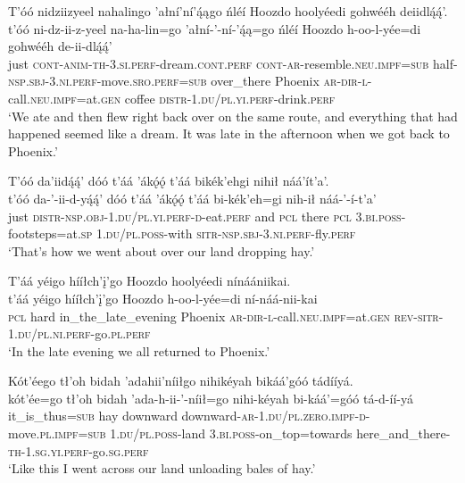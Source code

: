 \ea\label{ex:text9-3-28}
T’óó nidziizyeel nahalingo ’ałní’ní’ą́ągo ńléí Hoozdo hoolyéedi gohwééh deiidlą́ą́’.\\
\gll t’óó	ni-dz-ii-z-yeel	na-ha-lin=go	’ałní-’-ní-’ą́ą=go	ńléí	Hoozdo	h-oo-l-yée=di	gohwééh	de-ii-dlą́ą́’\\
     just	\textsc{cont}-\textsc{anim}-\textsc{th}-3.\textsc{si}.\textsc{perf}-dream.\textsc{cont}.\textsc{perf}	\textsc{cont}-\textsc{ar}-resemble.\textsc{neu}.\textsc{impf}=\textsc{sub}	half-\textsc{nsp}.\textsc{sbj}-3.\textsc{ni}.\textsc{perf}-move.\textsc{sro}.\textsc{perf}=\textsc{sub}	over\_there	Phoenix	\textsc{ar}-\textsc{dir}-\textsc{l}-call.\textsc{neu}.\textsc{impf}=at.\textsc{gen}	coffee	\textsc{distr}-1.\textsc{du}/\textsc{pl}.\textsc{yi}.\textsc{perf}-drink.\textsc{perf}\\
\glt `We ate and then flew right back over on the same route, and everything that had happened seemed like a dream. It was late in the afternoon when we got back to Phoenix.'
\z

\ea\label{ex:text9-3-29}
T’óó da’iidą́ą́’ dóó t’áá ’ákǫ́ǫ́ t’áá bikék’ehgi nihił náá’ít’a’.\\
\gll t’óó	da-’-ii-d-yą́ą́’	dóó	t’áá	’ákǫ́ǫ́	t’áá	bi-kék’eh=gi	nih-ił	náá-’-í-t’a’\\
     just	\textsc{distr}-\textsc{nsp}.\textsc{obj}-1.\textsc{du}/\textsc{pl}.\textsc{yi}.\textsc{perf}-\textsc{d}-eat.\textsc{perf}	and	\textsc{pcl}	there	\textsc{pcl}	3.\textsc{bi}.\textsc{poss}-footsteps=at.\textsc{sp}	1.\textsc{du}/\textsc{pl}.\textsc{poss}-with	\textsc{sitr}-\textsc{nsp}.\textsc{sbj}-3.\textsc{ni}.\textsc{perf}-fly.\textsc{perf}\\
\glt `That's how we went about over our land dropping hay.'
\z

\ea\label{ex:text9-3-30}
T’áá yéigo hííłch’į’go Hoozdo hoolyéedi nínáániikai.\\
\gll t’áá	yéigo	hííłch’į’go	Hoozdo	h-oo-l-yée=di	ní-náá-nii-kai\\
     \textsc{pcl}	hard	in\_the\_late\_evening	Phoenix	\textsc{ar}-\textsc{dir}-\textsc{l}-call.\textsc{neu}.\textsc{impf}=at.\textsc{gen}	\textsc{rev}-\textsc{sitr}-1.\textsc{du}/\textsc{pl}.\textsc{ni}.\textsc{perf}-go.\textsc{pl}.\textsc{perf}\\
\glt `In the late evening we all returned to Phoenix.'
\z

\ea\label{ex:text9-3-31}
Kót’éego tł’oh bidah ’adahii’níiłgo nihikéyah bikáá’góó tádííyá.\\
\gll kót’ée=go	tł’oh	bidah	’ada-h-ii-’-níił=go	nihi-kéyah	bi-káá’=góó	tá-d-íí-yá\\
     it\_is\_thus=\textsc{sub}	hay	downward	downward-\textsc{ar}-1.\textsc{du}/\textsc{pl}.\textsc{zero}.\textsc{impf}-\textsc{d}-move.\textsc{pl}.\textsc{impf}=\textsc{sub}	1.\textsc{du}/\textsc{pl}.\textsc{poss}-land	3.\textsc{bi}.\textsc{poss}-on\_top=towards	here\_and\_there-\textsc{th}-1.\textsc{sg}.\textsc{yi}.\textsc{perf}-go.\textsc{sg}.\textsc{perf}\\
\glt `Like this I went across our land unloading bales of hay.'
\z

